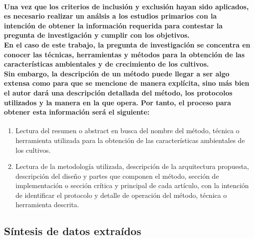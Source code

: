 \documentclass[10pt, twocolumn]{article}
\begin{document}
\paragraph{Una vez que los criterios de inclusión y exclusión hayan sido aplicados, es necesario realizar un análsis a los estudios primarios con la intención de obtener la información requerida para contestar la pregunta de investigación y cumplir con los objetivos. \\ En el caso de este trabajo, la pregunta de investigación se concentra en conocer las técnicas, herramientas y métodos para la obtención de las características ambientales y de crecimiento de los cultivos. \\ Sin embargo, la descripción de un método puede llegar a ser algo extensa como para que se mencione de manera explícita, sino más bien el autor dará una descripción detallada del método, los protocolos utilizados y la manera en la que opera. Por tanto, el proceso para obtener esta información será el siguiente:}
\begin{enumerate}
	\item{Lectura del resumen o abstract en busca del nombre del método, técnica o herramienta utilizada para la obtención de las características ambientales de los cultivos.}
	\item{Lectura de la metodología utilizada, descripción de la arquitectura propuesta, descripción del diseño y partes que componen el método, sección de implementación o sección crítica y principal de cada artículo, con la intención de identificar el protocolo y detalle de operación del método, técnica o herramienta descrita.}
\end{enumerate}

\subsection{Síntesis de datos extraídos}
\end{document}
